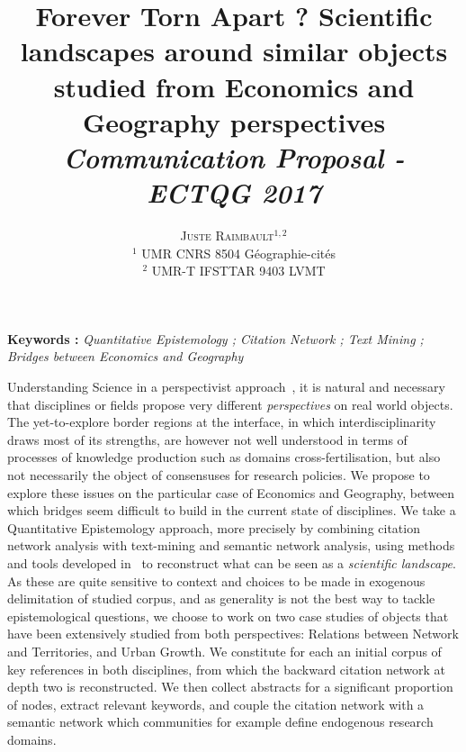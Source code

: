 \documentclass[11pt]{article}
\newcommand{\noun}[1]{\textsc{#1}}
\begin{document}
\title{Forever Torn Apart ? Scientific landscapes around similar objects studied from Economics and Geography perspectives
\bigskip\bigskip\\
\textit{Communication Proposal - ECTQG 2017}
}
\author{\noun{Juste Raimbault}$^{1,2}$\medskip\\
$^1$ UMR CNRS 8504 Géographie-cités\\
$^2$ UMR-T IFSTTAR 9403 LVMT
}
\date{}

\maketitle

\justify



\textbf{Keywords : }\textit{Quantitative Epistemology ; Citation Network ; Text Mining ; Bridges between Economics and Geography}

\medskip


Understanding Science in a perspectivist approach~\cite{giere2010scientific}, it is natural and necessary that disciplines or fields propose very different \emph{perspectives} on real world objects. The yet-to-explore border regions at the interface, in which interdisciplinarity draws most of its strengths, are however not well understood in terms of processes of knowledge production such as domains cross-fertilisation, but also not necessarily the object of consensuses for research policies. We propose to explore these issues on the particular case of Economics and Geography, between which bridges seem difficult to build in the current state of disciplines. We take a Quantitative Epistemology approach, more precisely by combining citation network analysis with text-mining and semantic network analysis, using methods and tools developed in~\cite{raimbault2016indirect} to reconstruct what can be seen as a \emph{scientific landscape}. As these are quite sensitive to context and choices to be made in exogenous delimitation of studied corpus, and as generality is not the best way to tackle epistemological questions, we choose to work on two case studies of objects that have been extensively studied from both perspectives: Relations between Network and Territories, and Urban Growth. We constitute for each an initial corpus of key references in both disciplines, from which the backward citation network at depth two is reconstructed. We then collect abstracts for a significant proportion of nodes, extract relevant keywords, and couple the citation network with a semantic network which communities for example define endogenous research domains.

















\end{document}
